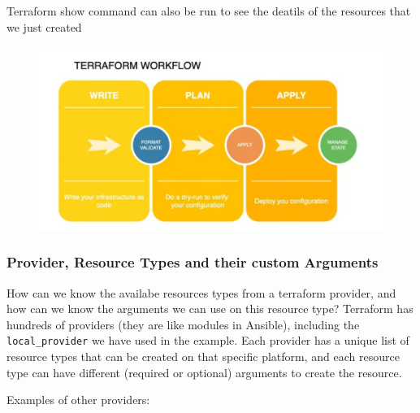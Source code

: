 \documentclass{article}
\newenvironment{blocktemplateI}[1]{%
    \tcolorbox[beamer,%
    noparskip,breakable,
    colframe=Violet,%
    colbacklower=Black,%
    title=#1]}%
    {\endtcolorbox}
\begin{document}
\begin{blocktemplateI}{Note}
Terraform show command can also be run to see the deatils of the resources that we just created
\end{blocktemplateI}

\begin{figure}[H]
    \includegraphics[width=\textwidth]{pictures/pic2.png}
    \centering
\end{figure}

\subsubsection{Provider, Resource Types and their custom Arguments}
How can we know the availabe resources types from a terraform provider, and how can we know the arguments we can use on this resource type? Terraform has hundreds of providers (they are like modules in Ansible), including the \verb+local_provider+ we have used in the example. Each provider has a unique list of resource types that can be created on that specific platform, and each resource type can have different (required or optional) arguments to create the resource.

Examples of other providers:
\end{document}

